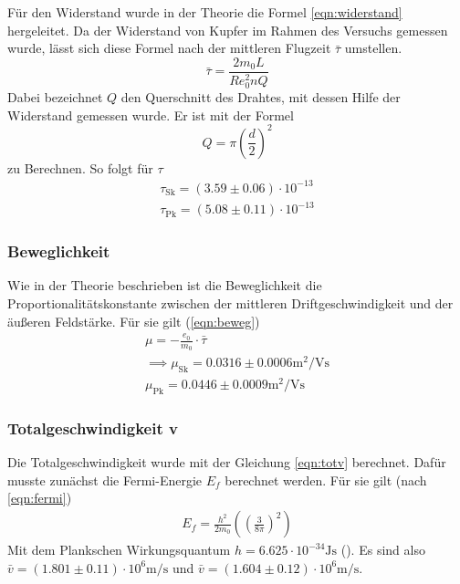 Für den Widerstand wurde in der Theorie die Formel \eqref{eqn:widerstand} hergeleitet. Da der Widerstand
von Kupfer im Rahmen des Versuchs gemessen wurde, lässt sich diese Formel nach
der mittleren Flugzeit $\bar{\tau}$ umstellen.
\begin{equation*}
\bar{\tau} = \frac{2 m_0 L}{R e_0^2 n Q}
\end{equation*}
Dabei bezeichnet $Q$ den Querschnitt des Drahtes, mit dessen Hilfe der Widerstand gemessen wurde.
Er ist mit der Formel
\begin{equation}
Q = \pi \left( \frac{d}{2} \right)^2
\end{equation}
zu Berechnen. So folgt für $\tau$
\begin{align*}
\tau_\text{Sk} = \left( 3.59 \pm 0.06 \right) \cdot 10^{-13}\\
\tau_\text{Pk} = \left( 5.08 \pm 0.11 \right) \cdot 10^{-13}
\end{align*}

\subsubsection{Beweglichkeit}

Wie in der Theorie beschrieben ist die Beweglichkeit die Proportionalitätskonstante zwischen 
der mittleren Driftgeschwindigkeit und der äußeren Feldstärke. Für sie gilt (\eqref{eqn:beweg})
\begin{align*}
\mu = -\frac{e_0}{m_0} \cdot \bar{\tau} \\
\implies \mu_\text{Sk} = 0.0316 \pm 0.0006 \si{\m\squared\per\V\s} \\
\mu_\text{Pk} = 0.0446 \pm 0.0009 \si{\m\squared\per\V\s}
\end{align*}

\subsubsection{Totalgeschwindigkeit v}

Die Totalgeschwindigkeit wurde mit der Gleichung \eqref{eqn:totv} berechnet.
Dafür musste zunächst die Fermi-Energie $E_f$ berechnet werden. Für sie gilt (nach \eqref{eqn:fermi})
\begin{align*}
E_f = \frac{h^2}{2 m_0} \left( \left( \frac{3}{8 \pi} \right)^2 \right)
\end{align*}
Mit dem Plankschen Wirkungsquantum $h = 6.625 \cdot 10^{-34}\si{\joule\s}$ (\cite{Planck}).
Es sind also $\bar{v} = \left( 1.801 \pm 0.11 \right) \cdot 10^{6} \si{\m\per\s}$ und 
$\bar{v} = \left( 1.604 \pm 0.12 \right) \cdot 10^{6} \si{\m\per\s}$.

